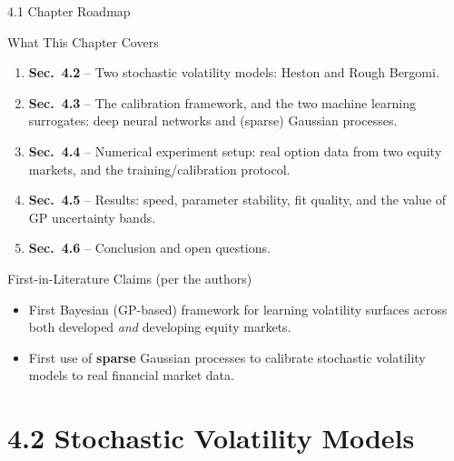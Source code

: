 \documentclass[aspectratio=169,10pt]{beamer}
\begin{document}
\begin{frame}{4.1 Chapter Roadmap}
  \begin{block}{What This Chapter Covers}
    \begin{enumerate}
      \item \textbf{Sec.\ 4.2} -- Two stochastic volatility models: Heston
            and Rough Bergomi.
      \item \textbf{Sec.\ 4.3} -- The calibration framework, and the two
            machine learning surrogates: deep neural networks and
            (sparse) Gaussian processes.
      \item \textbf{Sec.\ 4.4} -- Numerical experiment setup: real option
            data from two equity markets, and the training/calibration
            protocol.
      \item \textbf{Sec.\ 4.5} -- Results: speed, parameter stability,
            fit quality, and the value of GP uncertainty bands.
      \item \textbf{Sec.\ 4.6} -- Conclusion and open questions.
    \end{enumerate}
  \end{block}
  \begin{alertblock}{First-in-Literature Claims (per the authors)}
    \begin{itemize}
      \item First Bayesian (GP-based) framework for learning volatility
            surfaces across both developed \emph{and} developing equity
            markets.
      \item First use of \textbf{sparse} Gaussian processes to calibrate
            stochastic volatility models to real financial market data.
    \end{itemize}
  \end{alertblock}
\end{frame}

\section{4.2 Stochastic Volatility Models}
\end{document}
